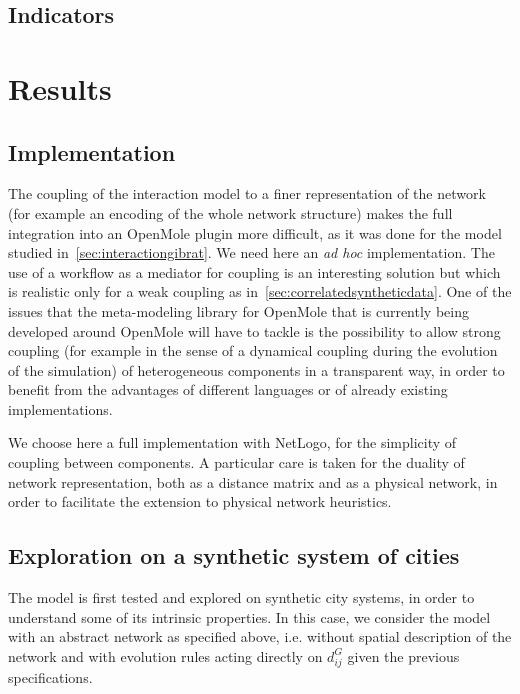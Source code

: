 \subsection{Indicators}



%


\section{Results}


\subsection{Implementation}

The coupling of the interaction model to a finer representation of the network (for example an encoding of the whole network structure) makes the full integration into an OpenMole plugin more difficult, as it was done for the model studied in~\ref{sec:interactiongibrat}. We need here an \emph{ad hoc} implementation. The use of a workflow as a mediator for coupling is an interesting solution but which is realistic only for a weak coupling as in~\ref{sec:correlatedsyntheticdata}. One of the issues that the meta-modeling library for OpenMole that is currently being developed around OpenMole will have to tackle is the possibility to allow strong coupling (for example in the sense of a dynamical coupling during the evolution of the simulation) of heterogeneous components in a transparent way, in order to benefit from the advantages of different languages or of already existing implementations. 

We choose here a full implementation with NetLogo, for the simplicity of coupling between components. A particular care is taken for the duality of network representation, both as a distance matrix and as a physical network, in order to facilitate the extension to physical network heuristics.



\subsection{Exploration on a synthetic system of cities}


The model is first tested and explored on synthetic city systems, in order to understand some of its intrinsic properties. In this case, we consider the model with an abstract network as specified above, i.e. without spatial description of the network and with evolution rules acting directly on $d^G_{ij}$ given the previous specifications. 


